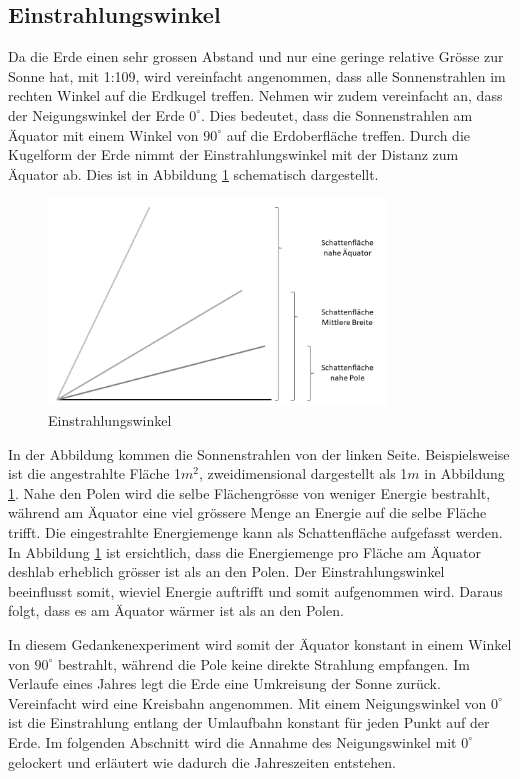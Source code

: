 \begin{refsection}
\section{Einstrahlungswinkel}\label{sec:winkel}
Da die Erde einen sehr grossen Abstand und nur eine geringe relative
Grösse zur Sonne hat, mit 1:109, wird vereinfacht angenommen, dass
alle Sonnenstrahlen im rechten Winkel auf die Erdkugel treffen.
Nehmen wir zudem vereinfacht an, dass der Neigungswinkel der Erde
$0^\circ$. Dies bedeutet, dass die Sonnenstrahlen am Äquator mit
einem Winkel von $90^\circ$ auf die Erdoberfläche treffen. Durch
die Kugelform der Erde nimmt der Einstrahlungswinkel mit der Distanz
zum Äquator ab. Dies ist in Abbildung \ref{fig:abb5} schematisch
dargestellt.
%
\begin{figure}
	\centering
	\includegraphics[width= 0.8\textwidth]{neigung/Schatten.png}
	\caption[Einstrahlungswinkel]{Einstrahlungswinkel}
	\label{fig:abb5}
\end{figure}
In der Abbildung kommen die Sonnenstrahlen von der linken Seite.
Beispielsweise ist die angestrahlte Fläche 1$m^2$, zweidimensional
dargestellt als 1$m$ in Abbildung \ref{fig:abb5}. Nahe den Polen
wird die selbe Flächengrösse von weniger Energie bestrahlt, während
am Äquator eine viel grössere Menge an Energie auf die selbe Fläche
trifft. Die eingestrahlte Energiemenge kann als Schattenfläche
aufgefasst werden. In Abbildung \ref{fig:abb5} ist ersichtlich,
dass die Energiemenge pro Fläche am Äquator deshlab erheblich grösser
ist als an den Polen. Der Einstrahlungswinkel beeinflusst somit,
wieviel Energie auftrifft und somit aufgenommen wird. Daraus folgt,
dass es am Äquator wärmer ist als an den Polen.

In diesem Gedankenexperiment wird somit der Äquator konstant in
einem Winkel von $90^\circ$ bestrahlt, während die Pole keine direkte
Strahlung empfangen. Im Verlaufe eines Jahres legt die Erde eine
Umkreisung der Sonne zurück. Vereinfacht wird eine Kreisbahn
angenommen. Mit einem Neigungswinkel von $0^\circ$ ist die Einstrahlung
entlang der Umlaufbahn konstant für jeden Punkt auf der Erde. Im
folgenden Abschnitt wird die Annahme des Neigungswinkel mit $0^\circ$
gelockert und erläutert wie dadurch die Jahreszeiten entstehen.


\end{refsection}
